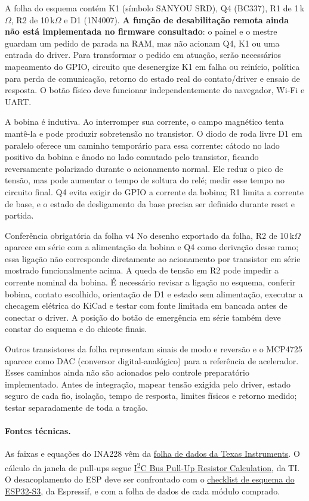 A folha do esquema contém K1 (símbolo SANYOU SRD), Q4 (BC337), R1 de 1\,k$\Omega$, R2 de 10\,k$\Omega$ e D1 (1N4007). \textbf{A função de desabilitação remota ainda não está implementada no firmware consultado}: o painel e o mestre guardam um pedido de parada na RAM, mas não acionam Q4, K1 ou uma entrada do driver. Para transformar o pedido em atuação, serão necessários mapeamento do GPIO, circuito que desenergize K1 em falha ou reinício, política para perda de comunicação, retorno do estado real do contato/driver e ensaio de resposta. O botão físico deve funcionar independentemente do navegador, Wi-Fi e UART.

A bobina é indutiva. Ao interromper sua corrente, o campo magnético tenta mantê-la e pode produzir sobretensão no transistor. O diodo de roda livre D1 em paralelo oferece um caminho temporário para essa corrente: cátodo no lado positivo da bobina e ânodo no lado comutado pelo transistor, ficando reversamente polarizado durante o acionamento normal. Ele reduz o pico de tensão, mas pode aumentar o tempo de soltura do relé; medir esse tempo no circuito final. Q4 evita exigir do GPIO a corrente da bobina; R1 limita a corrente de base, e o estado de desligamento da base precisa ser definido durante reset e partida.

\begin{nota}{Conferência obrigatória da folha v4}
No desenho exportado da folha, R2 de 10\,k$\Omega$ aparece em série com a alimentação da bobina e Q4 como derivação desse ramo; essa ligação não corresponde diretamente ao acionamento por transistor em série mostrado funcionalmente acima. A queda de tensão em R2 pode impedir a corrente nominal da bobina. É necessário revisar a ligação no esquema, conferir bobina, contato escolhido, orientação de D1 e estado sem alimentação, executar a checagem elétrica do KiCad e testar com fonte limitada em bancada antes de conectar o driver. A posição do botão de emergência em série também deve constar do esquema e do chicote finais.
\end{nota}

Outros transistores da folha representam sinais de modo e reversão e o MCP4725 aparece como DAC (conversor digital-analógico) para a referência de acelerador. Esses caminhos ainda não são acionados pelo controle preparatório implementado. Antes de integração, mapear tensão exigida pelo driver, estado seguro de cada fio, isolação, tempo de resposta, limites físicos e retorno medido; testar separadamente de toda a tração.

\paragraph{Fontes técnicas.}
As faixas e equações do INA228 vêm da \href{https://www.ti.com/lit/ds/symlink/ina228.pdf}{folha de dados da Texas Instruments}. O cálculo da janela de pull-ups segue \href{https://www.ti.com/lit/an/slva689/slva689.pdf}{I\textsuperscript{2}C Bus Pull-Up Resistor Calculation}, da TI. O desacoplamento do ESP deve ser confrontado com o \href{https://docs.espressif.com/projects/esp-hardware-design-guidelines/en/latest/esp32s3/schematic-checklist.html}{checklist de esquema do ESP32-S3}, da Espressif, e com a folha de dados de cada módulo comprado.
